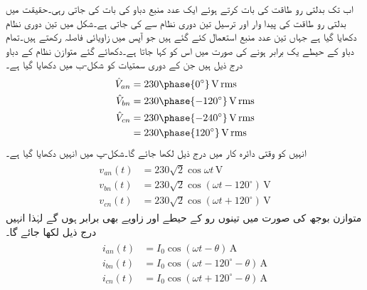 اب تک بدلتی رو طاقت کی بات کرتے ہوئے  ایک عدد منبع دباو کی بات کی جاتی رہی۔حقیقت میں بدلتی رو طاقت کی پیدا وار اور ترسیل تین دوری نظام سے کی جاتی ہے۔شکل  میں تین دوری نظام دکھایا گیا ہے جہاں تین عدد منبع استعمال کئے گئے ہیں جو آپس میں  زاویائی فاصلہ رکھتے ہیں۔تمام دباو کے حیطے یک برابر ہونے کی صورت میں اس کو  کہا جاتا ہے۔دکھائے گئے متوازن نظام کے دباو درج ذیل ہیں جن کے دوری سمتیات کو شکل-ب میں دکھایا گیا ہے۔
\begin{gather}
\begin{aligned}
\hat{V}_{an}&=230 \phase{0^{\circ}}\,\si{\volt}\, \rms\\
\hat{V}_{bn}&=230 \phase{-120^{\circ}}\,\si{\volt}\, \rms\\
\hat{V}_{cn}&=230 \phase{-240^{\circ}}\,\si{\volt}\, \rms\\
&=230 \phase{120^{\circ}}\,\si{\volt}\, \rms
\end{aligned}
\end{gather}
انہیں کو وقتی دائرہ کار میں درج ذیل لکھا جائے گا۔شکل-پ میں انہیں دکھایا گیا ہے۔
\begin{gather}
\begin{aligned}\label{مساوات_تین_دوری_ستارہ_الف}
v_{an}(t)&=230\sqrt{2} \cos\omega t \,\si{\volt}\\
v_{bn}(t)&=230\sqrt{2} \cos(\omega t-120^{\circ})\,\si{\volt}\\
v_{cn}(t)&=230\sqrt{2} \cos(\omega t +120^{\circ})\,\si{\volt}
\end{aligned}
\end{gather}
متوازن بوجھ کی صورت میں تینوں رو کے حیطے اور زاویے بھی برابر ہوں گے لہٰذا انہیں درج ذیل لکھا جائے گا۔
\begin{gather}
\begin{aligned}
i_{an}(t)&=I_0 \cos(\omega t -\theta)\,\si{\ampere}\\
i_{bn}(t)&=I_0 \cos(\omega t-120^{\circ}-\theta)\,\si{\ampere}\\
i_{cn}(t)&=I_0 \cos(\omega t +120^{\circ}-\theta)\,\si{\ampere}
\end{aligned}
\end{gather}
%
